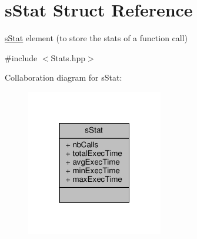\hypertarget{structs_stat}{}\section{s\+Stat Struct Reference}
\label{structs_stat}


\hyperlink{structs_stat}{s\+Stat} element (to store the stats of a function call)  




{\ttfamily \#include $<$Stats.\+hpp$>$}



Collaboration diagram for s\+Stat\+:
\nopagebreak
\begin{figure}[H]
\begin{center}
\leavevmode
\includegraphics[width=169pt]{structs_stat__coll__graph}
\end{center}
\end{figure}
